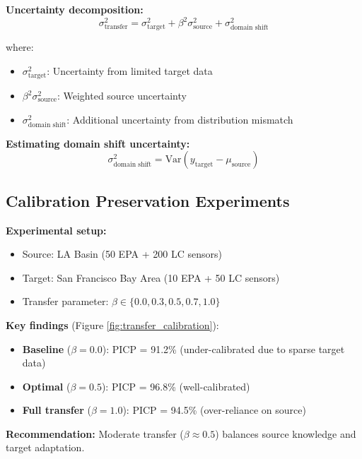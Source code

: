 \documentclass[11pt,letterpaper]{article}
\begin{document}
\textbf{Uncertainty decomposition:}
\begin{equation}
\sigma^2_{\text{transfer}} = \sigma^2_{\text{target}} + \beta^2 \sigma^2_{\text{source}} + \sigma^2_{\text{domain shift}}
\label{eq:transfer_decomposition}
\end{equation}

where:
\begin{itemize}
    \item $\sigma^2_{\text{target}}$: Uncertainty from limited target data
    \item $\beta^2 \sigma^2_{\text{source}}$: Weighted source uncertainty
    \item $\sigma^2_{\text{domain shift}}$: Additional uncertainty from distribution mismatch
\end{itemize}

\textbf{Estimating domain shift uncertainty:}
\begin{equation}
\sigma^2_{\text{domain shift}} = \text{Var}(y_{\text{target}} - \mu_{\text{source}})
\label{eq:domain_shift}
\end{equation}

\subsection{Calibration Preservation Experiments}

\textbf{Experimental setup:}
\begin{itemize}
    \item Source: LA Basin (50 EPA + 200 LC sensors)
    \item Target: San Francisco Bay Area (10 EPA + 50 LC sensors)
    \item Transfer parameter: $\beta \in \{0.0, 0.3, 0.5, 0.7, 1.0\}$
\end{itemize}

\textbf{Key findings} (Figure \ref{fig:transfer_calibration}):
\begin{itemize}
    \item \textbf{Baseline} ($\beta = 0.0$): PICP = 91.2\% (under-calibrated due to sparse target data)
    \item \textbf{Optimal} ($\beta = 0.5$): PICP = 96.8\% (well-calibrated)
    \item \textbf{Full transfer} ($\beta = 1.0$): PICP = 94.5\% (over-reliance on source)
\end{itemize}

\textbf{Recommendation:} Moderate transfer ($\beta \approx 0.5$) balances source knowledge and target adaptation.
\end{document}
